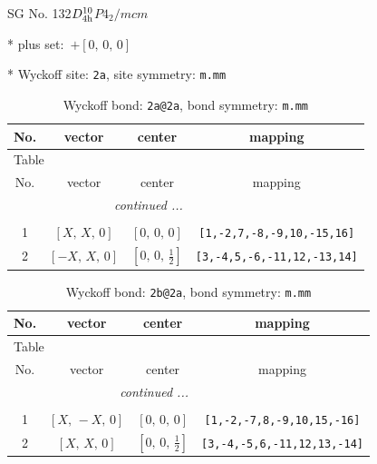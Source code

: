 \documentclass[fleqn,8pt]{jsarticle}
\begin{document}
\setcounter{MaxMatrixCols}{32}

\renewcommand{\tablename}{Table~}
\renewcommand{\figurename}{Figure~}
\begin{center}
\LARGE
SG No. 132\quad$D_{\rm 4h}^{10}$\quad$P4_2/mcm$\quad[ tetragonal ]
\end{center}

* plus set:\,\,\,$+\left[ 0,\, 0,\, 0 \right]$


* Wyckoff site: {\tt 2a}, site symmetry: {\tt m.mm}
\renewcommand{\arraystretch}{1.2}
\begin{longtable}{cccc}
\caption{Wyckoff bond: {\tt 2a@2a}, bond symmetry: {\tt m.mm}}
 \\
 \hline \hline
No. & vector & center & mapping \\ \hline \endfirsthead

\multicolumn{3}{l}{\tablename\ \thetable{}} \\
 \hline \hline
No. & vector & center & mapping \\ \hline \endhead

 \hline \hline
\multicolumn{3}{r}{\footnotesize\it continued ...} \\ \endfoot

 \hline \hline
\multicolumn{3}{r}{} \\ \endlastfoot

1 & $\left[ X,\, X,\, 0 \right]$ & $\left[ 0,\, 0,\, 0 \right]$ & {\tt [1,-2,7,-8,-9,10,-15,16]} \\ \hline
2 & $\left[ - X,\, X,\, 0 \right]$ & $\left[ 0,\, 0,\, \frac{1}{2} \right]$ & {\tt [3,-4,5,-6,-11,12,-13,14]} \\
\end{longtable}
\renewcommand{\arraystretch}{1.2}
\begin{longtable}{cccc}
\caption{Wyckoff bond: {\tt 2b@2a}, bond symmetry: {\tt m.mm}}
 \\
 \hline \hline
No. & vector & center & mapping \\ \hline \endfirsthead

\multicolumn{3}{l}{\tablename\ \thetable{}} \\
 \hline \hline
No. & vector & center & mapping \\ \hline \endhead

 \hline \hline
\multicolumn{3}{r}{\footnotesize\it continued ...} \\ \endfoot

 \hline \hline
\multicolumn{3}{r}{} \\ \endlastfoot

1 & $\left[ X,\, - X,\, 0 \right]$ & $\left[ 0,\, 0,\, 0 \right]$ & {\tt [1,-2,-7,8,-9,10,15,-16]} \\ \hline
2 & $\left[ X,\, X,\, 0 \right]$ & $\left[ 0,\, 0,\, \frac{1}{2} \right]$ & {\tt [3,-4,-5,6,-11,12,13,-14]} \\
\end{longtable}
\end{document}
